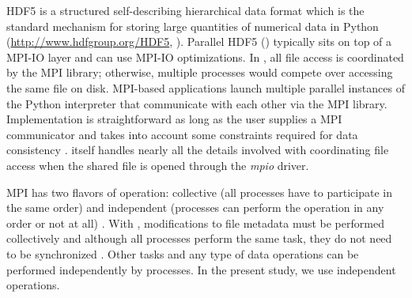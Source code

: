HDF5 is a structured self-describing hierarchical data format which is the standard mechanism for storing large quantities of numerical data in Python (\url{http://www.hdfgroup.org/HDF5}, \cite{pythonhdf5}).
Parallel HDF5 () typically sits on top of a MPI-IO layer and can use MPI-IO optimizations. 
In , all file access is coordinated by the MPI library; otherwise, multiple processes would compete over accessing the same file on disk. 
MPI-based applications launch multiple parallel instances of the Python interpreter that communicate with each other via the MPI library. 
Implementation is straightforward as long as the user supplies a MPI communicator and takes into account some constraints required for data consistency \cite{pythonhdf5}.
 itself handles nearly all the details involved with coordinating file access when the shared file is opened through the \emph{mpio} driver.

MPI has two flavors of operation: collective (all processes have to participate in the same order) and independent (processes can perform the operation in any order or not at all) \cite{pythonhdf5}.
With , modifications to file metadata must be performed collectively and although all processes perform the same task, they do not need to be synchronized \cite{pythonhdf5}. 
Other tasks and any type of data operations can be performed independently by processes.
In the present study, we use independent operations.
